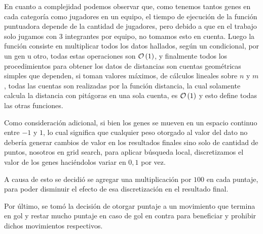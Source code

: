 En cuanto a complejidad podemos observar que, como tenemos tantos genes en cada categoría como jugadores en un
equipo, el tiempo de ejecución de la función puntuadora depende de la cantidad de jugadores,
pero debido a que en el trabajo solo jugamos con 3 integrantes por equipo, no tomamos esto en cuenta.
Luego la función consiste en multiplicar todos los datos hallados, según un condicional, por un gen u otro,
todas estas operaciones son $\mathcal{O}\left(1\right)$, y finalmente todos los procedimientos para obtener los datos de distancias
son cuentas geométricas simples que dependen, si toman valores máximos, de cálculos lineales sobre $n$ y $m$, todas
las cuentas son realizadas por la función distancia, la cual solamente calcula la distancia con pitágoras en una sola
cuenta, es $\mathcal{O}\left(1\right)$ y esto define todas las otras funciones.



Como consideración adicional, si bien los genes se mueven en un espacio continuo entre $-1$ y $1$,
lo cual significa que cualquier peso otorgado al valor del dato no debería generar
cambios de valor en los resultados finales sino solo de cantidad de puntos,
nosotros en grid search, para aplicar búsqueda local, discretizamos el valor de los
genes haciéndolos variar en $0,1$ por vez.


A causa de esto se decidió se agregar una multiplicación por $100$ en cada
puntaje, para poder disminuir el efecto de esa discretización en el resultado final.


Por último, se tomó la decisión de otorgar puntaje a un movimiento que termina
en gol y restar mucho puntaje en caso de gol en contra para beneficiar y
prohibir dichos movimientos respectivos.
